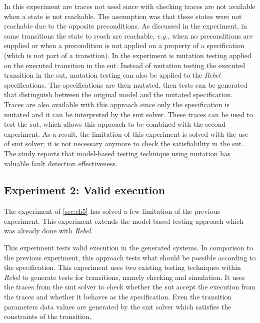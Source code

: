 In this experiment are traces not used since with checking traces are not
available when a state is not reachable. The assumption was that these states
were not reachable due to the opposite preconditions. As discussed in the
experiment, in some transitions the state to reach are reachable, \textit{e.g.},
when no preconditions are supplied or when a precondition is not applied on a
property of a specification (which is not part of a transition). In the
experiment is mutation testing applied on the executed transition in the
\gls{sut}. Instead of mutation testing the executed transition in the
\gls{sut}, mutation testing can also be applied to the \textit{Rebel}
specifications.
The specifications are then mutated, then tests can be generated that
distinguish between the original model and the mutated
specification.~\cite[p.~8]{utting2012taxonomy}
Traces are also available with this approach since only the specification is
mutated and it can be interpreted by the \gls{smt} solver. These traces can be
used to test the \gls{sut}, which allows this approach to be combined with the
second experiment. As a result, the limitation of this experiment is solved
with the use of \gls{smt} solver; it is not necessary anymore to check the
satisfiability in the \gls{sut}. The study \cite{paradkar2005case} reports that
model-based testing technique using mutation has valuable fault detection
effectiveness.


\subsection{Experiment 2: Valid execution}
The experiment of \autoref{sec:ch5} has solved a few limitation of the previous
experiment. This experiment extends the model-based testing approach which was
already done with \textit{Rebel}.

This experiment tests valid execution in the generated systems. In comparison to
the previous experiment, this approach tests what should be possible according
to the specification. This experiment uses two existing testing techniques
within \textit{Rebel} to generate tests for transitions, namely checking and
simulation. It uses the traces from the \gls{smt} solver to check whether the
\gls{sut} accept the execution from the traces and whether it behaves as the
specification. Even the transition parameters data values are generated by the
\gls{smt} solver which satisfies the constraints of the transition.

